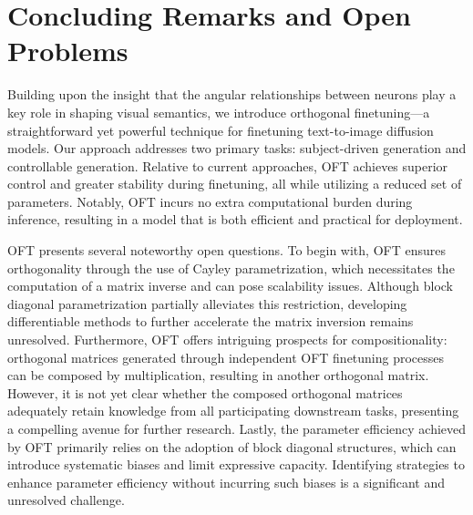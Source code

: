 \section{Concluding Remarks and Open Problems}

Building upon the insight that the angular relationships between neurons play a key role in shaping visual semantics, we introduce orthogonal finetuning—a straightforward yet powerful technique for finetuning text-to-image diffusion models. Our approach addresses two primary tasks: subject-driven generation and controllable generation. Relative to current approaches, OFT achieves superior control and greater stability during finetuning, all while utilizing a reduced set of parameters. Notably, OFT incurs no extra computational burden during inference, resulting in a model that is both efficient and practical for deployment.

OFT presents several noteworthy open questions. To begin with, OFT ensures orthogonality through the use of Cayley parametrization, which necessitates the computation of a matrix inverse and can pose scalability issues. Although block diagonal parametrization partially alleviates this restriction, developing differentiable methods to further accelerate the matrix inversion remains unresolved. Furthermore, OFT offers intriguing prospects for compositionality: orthogonal matrices generated through independent OFT finetuning processes can be composed by multiplication, resulting in another orthogonal matrix. However, it is not yet clear whether the composed orthogonal matrices adequately retain knowledge from all participating downstream tasks, presenting a compelling avenue for further research. Lastly, the parameter efficiency achieved by OFT primarily relies on the adoption of block diagonal structures, which can introduce systematic biases and limit expressive capacity. Identifying strategies to enhance parameter efficiency without incurring such biases is a significant and unresolved challenge.

